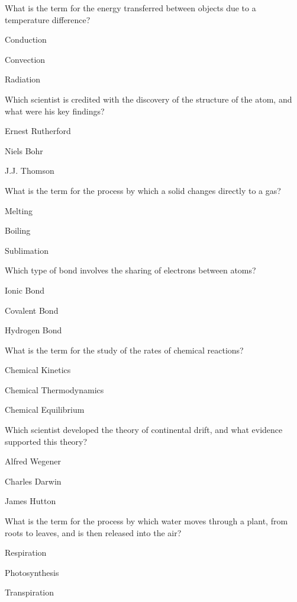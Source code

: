 \begin{enhancedmcq}{What is the term for the energy transferred between objects due to a temperature difference?}
\item Conduction
\item Convection
\item Radiation

\end{enhancedmcq}
\begin{enhancedmcq}{Which scientist is credited with the discovery of the structure of the atom, and what were his key findings?}
\item Ernest Rutherford
\item Niels Bohr
\item J.J. Thomson

\end{enhancedmcq}
\begin{enhancedmcq}{What is the term for the process by which a solid changes directly to a gas?}
\item Melting
\item Boiling
\item Sublimation

\end{enhancedmcq}
\begin{enhancedmcq}{Which type of bond involves the sharing of electrons between atoms?}
\item Ionic Bond
\item Covalent Bond
\item Hydrogen Bond

\end{enhancedmcq}
\begin{enhancedmcq}{What is the term for the study of the rates of chemical reactions?}
\item Chemical Kinetics
\item Chemical Thermodynamics
\item Chemical Equilibrium

\end{enhancedmcq}
\begin{enhancedmcq}{Which scientist developed the theory of continental drift, and what evidence supported this theory?}
\item Alfred Wegener
\item Charles Darwin
\item James Hutton

\end{enhancedmcq}
\begin{enhancedmcq}{What is the term for the process by which water moves through a plant, from roots to leaves, and is then released into the air?}
\item Respiration
\item Photosynthesis
\item Transpiration

\end{enhancedmcq}
